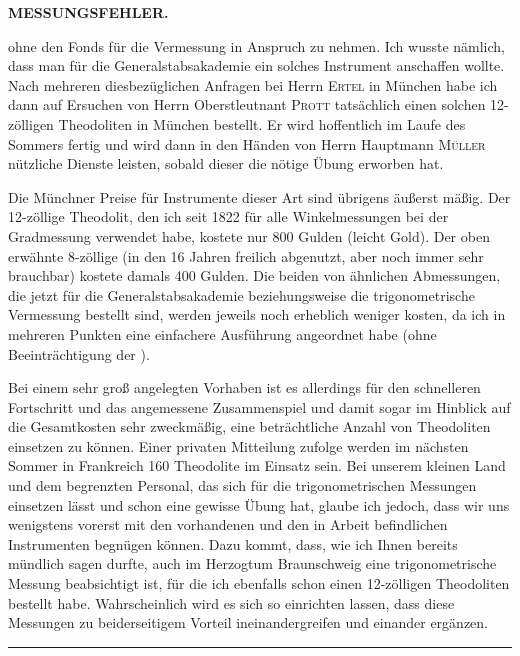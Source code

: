 \par\clearpage
\noindent\null\hfill{\small\textbf{MESSUNGSFEHLER.}}\hfill{}\par\medskip
\noindent ohne den Fonds für die Vermessung in Anspruch zu nehmen. Ich wusste nämlich, dass man für die Generalstabsakademie ein solches Instrument anschaffen wollte. Nach mehreren diesbezüglichen Anfragen bei Herrn \textsc{Ertel} in München habe ich dann auf Ersuchen von Herrn Oberstleutnant \textsc{Prott} tatsächlich einen solchen 12-zölligen Theodoliten in München bestellt. Er wird hoffentlich im Laufe des Sommers fertig und wird dann in den Händen von Herrn Hauptmann \textsc{Müller} nützliche Dienste leisten, sobald dieser die nötige Übung erworben hat.

\par\noindent\hspace*{\parindent}Die Münchner Preise für Instrumente dieser Art sind übrigens äußerst mäßig. Der 12-zöllige Theodolit, den ich seit 1822 für alle Winkelmessungen bei der Gradmessung verwendet habe, kostete nur 800 Gulden (leicht Gold). Der oben erwähnte 8-zöllige (in den 16 Jahren freilich  abgenutzt, aber noch immer sehr brauchbar) kostete damals 400 Gulden. Die beiden von ähnlichen Abmessungen, die jetzt für die Generalstabsakademie beziehungsweise die trigonometrische Vermessung bestellt sind, werden jeweils noch erheblich weniger kosten, da ich in mehreren Punkten eine einfachere Ausführung angeordnet habe (ohne Beeinträchtigung der ).

\par\noindent\hspace*{\parindent}Bei einem sehr groß angelegten Vorhaben ist es allerdings für den schnelleren Fortschritt und das angemessene Zusammenspiel und damit sogar im Hinblick auf die Gesamtkosten sehr zweckmäßig, eine beträchtliche Anzahl von Theodoliten einsetzen zu können. Einer privaten Mitteilung zufolge werden im nächsten Sommer in Frankreich 160 Theodolite im Einsatz sein. Bei unserem kleinen Land und dem begrenzten Personal, das sich für die trigonometrischen Messungen einsetzen lässt und schon eine gewisse Übung hat, glaube ich jedoch, dass wir uns wenigstens vorerst mit den vorhandenen und den in Arbeit befindlichen Instrumenten begnügen können. Dazu kommt, dass, wie ich Ihnen bereits mündlich sagen durfte, auch im Herzogtum Braunschweig eine trigonometrische Messung beabsichtigt ist, für die ich ebenfalls schon einen 12-zölligen Theodoliten bestellt habe. Wahrscheinlich wird es sich so einrichten lassen, dass diese Messungen zu beiderseitigem Vorteil ineinandergreifen und einander ergänzen.
\begin{center}\rule{3.5cm}{.4pt}\end{center}
\noindent{}\par


